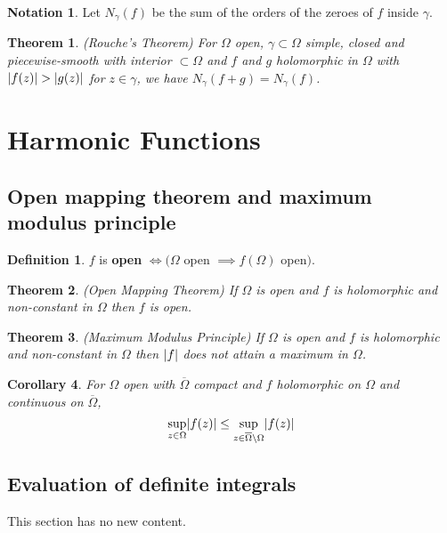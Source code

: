 \documentclass[12pt]{article}
\newtheorem{thm}{Theorem}[section]
\newtheorem{cor}[thm]{Corollary}
\theoremstyle{definition}
\newtheorem{defn}{Definition}[section]
\newtheorem*{not*}{Notation}
\DeclarePairedDelimiter\abs{\lvert}{\rvert}
\begin{document}
\begin{not*}
  Let $N_{\gamma}(f)$ be the sum of the orders of the zeroes of $f$ inside $\gamma$.
\end{not*}

\begin{thm}
  (Rouche's Theorem)
  For $\Omega$ open, $\gamma \subset \Omega$ simple, closed and piecewise-smooth with interior $\subset \Omega$ and $f$ and $g$ holomorphic in $\Omega$ with $\abs{f(z)} > \abs{g(z)}$ for $z \in \gamma$, we have $N_{\gamma}(f + g) = N_{\gamma}(f)$.
\end{thm}

\section{Harmonic Functions}

\subsection{Open mapping theorem and maximum modulus principle}

\begin{defn}
  $f$ is \textbf{open} $\iff (\Omega$ open $\implies f(\Omega)$ open$)$.
\end{defn}

\begin{thm}
  (Open Mapping Theorem)
  If $\Omega$ is open and $f$ is holomorphic and non-constant in $\Omega$ then $f$ is open.
\end{thm}

\begin{thm}
  (Maximum Modulus Principle)
  If $\Omega$ is open and $f$ is holomorphic and non-constant in $\Omega$ then $\abs{f}$ does not attain a maximum in $\Omega$.
\end{thm}

\begin{cor}
  For $\Omega$ open with $\overline{\Omega}$ compact and $f$ holomorphic on $\Omega$ and continuous on $\overline{\Omega}$,
  $$\sup_{z \in \Omega}\abs{f(z)} \leq \sup_{z \in \overline{\Omega} \setminus \Omega}\abs{f(z)}$$
\end{cor}

\subsection{Evaluation of definite integrals}

This section has no new content.
\end{document}
